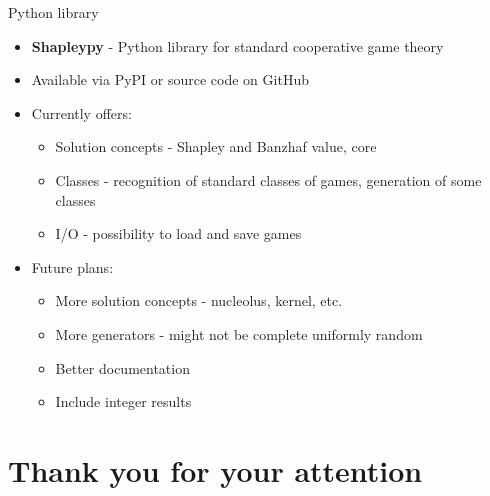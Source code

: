 \documentclass{beamer}
\begin{document}
\begin{frame}{Python library}
    \begin{itemize}
        \item \textbf{Shapleypy} - Python library for standard cooperative game theory
        \item Available via PyPI or source code on GitHub
        \item Currently offers:
        \begin{itemize}
            \item Solution concepts - Shapley and Banzhaf value, core
            \item Classes - recognition of standard classes of games, generation of some classes
            \item I/O - possibility to load and save games
        \end{itemize}
        \item Future plans:
        \begin{itemize}
            \item More solution concepts - nucleolus, kernel, etc.
            \item More generators - might not be complete uniformly random
            \item Better documentation
            \item Include integer results
        \end{itemize}
    \end{itemize}
    
\end{frame}


\section{Thank you for your attention}
\end{document}
